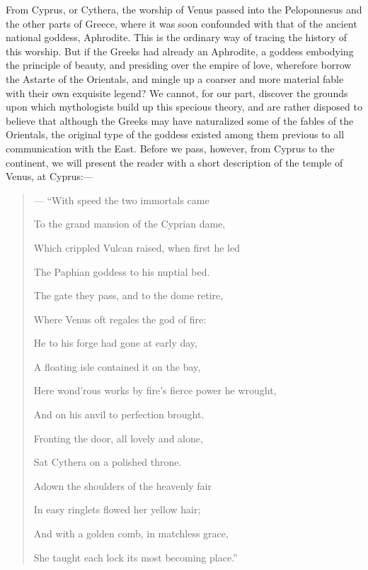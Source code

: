 \documentclass[a4paper, 11pt, oneside, polutonikogreek, english]{article}
\begin{document}
From Cyprus, or Cythera, the worship of Venus passed into the Peloponnesus and the other parts of Greece, where it was soon confounded with that of the ancient national goddess, Aphrodite. This is the ordinary way of tracing the history of this worship. But if the Greeks had already an Aphrodite, a goddess embodying the principle of beauty, and presiding over the empire of love, wherefore borrow the Astarte of the Orientals, and mingle up a coarser and more material fable with their own exquisite legend? We cannot, for our part, discover the grounds upon which mythologists build up this specious theory, and are rather disposed to believe that although the Greeks may have naturalized some of the fables of the Orientals, the original type of the goddess existed among them previous to all communication with the East. Before we pass, however, from Cyprus to the continent, we will present the reader with a short description of the temple of Venus, at Cyprus:--- 
\begin{quotation}\footnotesize
--- ``With speed the two immortals came

To the grand mansion of the Cyprian dame,

Which crippled Vulcan raised, when first he led

The Paphian goddess to his nuptial bed.

The gate they pass, and to the dome retire,

Where Venus oft regales the god of fire:

He to his forge had gone at early day,

A floating isle contained it on the bay,

Here wond'rous works by fire's fierce power he wrought,

And on his anvil to perfection brought.

Fronting the door, all lovely and alone,

Sat Cythera on a polished throne.

Adown the shoulders of the heavenly fair

In easy ringlets flowed her yellow hair;

And with a golden comb, in matchless grace,

She taught each lock its most becoming place.''
\end{quotation}
\end{document}
